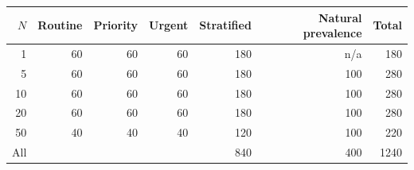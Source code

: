 \begin{tabular}{rrrrrrr}
\toprule
$N$ & Routine & Priority & Urgent & Stratified & Natural prevalence & Total \\
\midrule
1 & 60 & 60 & 60 & 180 & n/a & 180 \\
5 & 60 & 60 & 60 & 180 & 100 & 280 \\
10 & 60 & 60 & 60 & 180 & 100 & 280 \\
20 & 60 & 60 & 60 & 180 & 100 & 280 \\
50 & 40 & 40 & 40 & 120 & 100 & 220 \\
All &  &  &  & 840 & 400 & 1240 \\
\bottomrule
\end{tabular}
